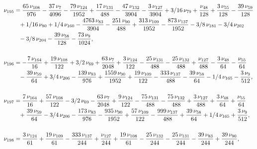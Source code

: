 \documentclass[a4paper,12pt, DIV=14, BCOR=5mm, twoside, headsepline, numbers=noenddot]{scrbook}
\begin{document}
\begin{align}\label{AreaSol18}
\begin{aligned}
\nu_{{195}}&={\frac {65\,\nu_{{108}}}{976}}-{\frac {37\,\nu_{{7}
}}{4096}}-{\frac {79\,\nu_{{124}}}{1952}}+{\frac {17\,\nu_{{131}}}{488
}}-{\frac {47\,\nu_{{132}}}{3904}}-{\frac {3\,\nu_{{127}}}{3904}}+3/16
\,\nu_{{79}}+{\frac {\nu_{{48}}}{128}}+{\frac {3\,\nu_{{55}}}{128}}-{
\frac {39\,\nu_{{59}}}{128}}\\
 &\hphantom{=}+1/16\,\nu_{{80}}+1/4\,\nu_{{160}}-{\frac 
{4763\,\nu_{{83}}}{3904}}-{\frac {251\,\nu_{{90}}}{488}}+{\frac {313\,
\nu_{{109}}}{1952}}-{\frac {873\,\nu_{{137}}}{1952}}-3/8\,\nu_{{181}}-
3/4\,\nu_{{202}}\\
 &\hphantom{=}-3/8\,\nu_{{204}}-{\frac {39\,\nu_{{58}}}{128}}-{
\frac {73\,\nu_{{9}}}{1024}},\\
\\
\nu_{{196}}&=-{\frac {7\,\nu_{{164}}}{16}}
+{\frac {19\,\nu_{{108}}}{122}}+3/2\,\nu_{{69}}+{\frac {63\,\nu_{{7}}
}{2048}}+{\frac {3\,\nu_{{124}}}{122}}-{\frac {25\,\nu_{{131}}}{488}}-
{\frac {25\,\nu_{{132}}}{488}}+{\frac {\nu_{{127}}}{488}}-{\frac {3\,
\nu_{{48}}}{64}}-{\frac {\nu_{{55}}}{64}}\\
 &\hphantom{=}-{\frac {39\,\nu_{{59}}}{64}}
+3/4\,\nu_{{206}}-{\frac {139\,\nu_{{83}}}{976}}+{\frac {1559\,\nu_{{
90}}}{1952}}+{\frac {19\,\nu_{{109}}}{122}}-{\frac {333\,\nu_{{137}}}{
488}}-{\frac {39\,\nu_{{58}}}{64}}-1/4\,\nu_{{165}}-{\frac {3\,\nu_{{9
}}}{512}}, \\
\\
\nu_{{197}}&={\frac {7\,\nu_{{164}}}{16}}+{\frac {57\,\nu_{{
108}}}{122}}-3/2\,\nu_{{69}}-{\frac {63\,\nu_{{7}}}{2048}}+{\frac {9\,
\nu_{{124}}}{122}}-{\frac {75\,\nu_{{131}}}{488}}-{\frac {75\,\nu_{{
132}}}{488}}+{\frac {3\,\nu_{{127}}}{488}}+{\frac {3\,\nu_{{48}}}{64}}
+{\frac {\nu_{{55}}}{64}}\\
 &\hphantom{=}+{\frac {39\,\nu_{{59}}}{64}}-3/4\,\nu_{{206}
}-{\frac {173\,\nu_{{83}}}{976}}-{\frac {935\,\nu_{{90}}}{1952}}+{
\frac {57\,\nu_{{109}}}{122}}-{\frac {999\,\nu_{{137}}}{488}}+{\frac {
39\,\nu_{{58}}}{64}}+1/4\,\nu_{{165}}+{\frac {3\,\nu_{{9}}}{512}}, \\
\\
\nu_
{{198}}&={\frac {3\,\nu_{{124}}}{61}}+{\frac {19\,\nu_{{109}}}{61}}-{
\frac {333\,\nu_{{137}}}{244}}+{\frac {\nu_{{127}}}{244}}+{\frac {19\,
\nu_{{108}}}{61}}-{\frac {25\,\nu_{{132}}}{244}}-{\frac {25\,\nu_{{131
}}}{244}}-{\frac {39\,\nu_{{83}}}{244}}+{\frac {39\,\nu_{{90}}}{244}},\\

\end{aligned}
\end{align}
\end{document}
